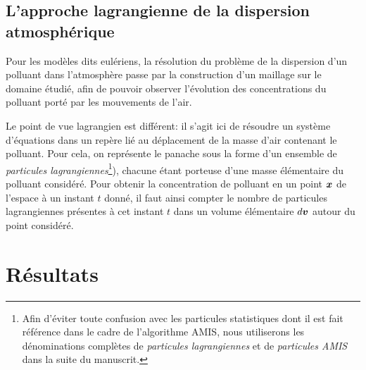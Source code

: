 \subsection{L'approche lagrangienne de la dispersion atmosphérique}

Pour les modèles dits eulériens, la résolution du problème de la dispersion d'un polluant dans l'atmosphère passe par la construction d'un maillage sur le domaine étudié, afin de pouvoir observer l'évolution des concentrations du polluant porté par les mouvements de l'air. 

Le point de vue lagrangien est différent: il s'agit ici de résoudre un système d'équations dans un repère lié au déplacement de la masse d'air contenant le polluant. Pour cela, on représente le panache sous la forme d'un ensemble de \textit{particules lagrangiennes}\footnote{Afin d'éviter toute confusion avec les particules statistiques dont il est fait référence dans le cadre de l'algorithme AMIS, nous utiliserons les dénominations complètes  de \textit{particules lagrangiennes} et de \textit{particules AMIS} dans la suite du manuscrit.}), chacune étant porteuse d'une masse élémentaire du polluant considéré. Pour obtenir la concentration de polluant en un point ${\bm{x}}$ de l'espace à un instant $t$ donné, il faut ainsi compter le nombre de particules lagrangiennes présentes à cet instant $t$ dans un volume élémentaire $d{\bm{v}}$ autour du point considéré. 



\section{Résultats}

